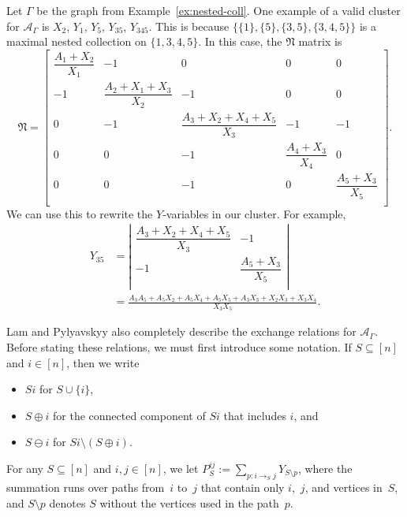 \documentclass[pdftex]{sigma}
\numberwithin{equation}{section}
\begin{document}
\begin{Example}\label{ex:graph-LP}
Let $\Gamma$ be the graph from Example~\ref{ex:nested-coll}. One example of a valid cluster for $\mathcal{A}_\Gamma$ is $X_2$, $Y_1$, $Y_5$, $Y_{35}$, $Y_{345}$. This is because $\{\{1\}, \{5\}, \{3,5\}, \{3,4,5\}\}$ is a maximal nested collection on $\{1,3,4,5\}$. In this case, the $\mathfrak{N}$ matrix is
\[
\mathfrak{N}=
\begin{bmatrix}
\dfrac{A_1+X_2}{X_1} & -1 & 0 & 0 & 0 \\
-1 & \dfrac{A_2+X_1+X_3}{X_2} & -1 & 0 & 0 \\
0 & -1 & \dfrac{A_3+X_2+X_4+X_5}{X_3} & -1 & -1 \\
0 & 0 & -1 & \dfrac{A_4+X_3}{X_4} & 0 \\
0 & 0 & -1 & 0 & \dfrac{A_5+X_3}{X_5} \\
\end{bmatrix}.
\]
We can use this to rewrite the $Y$-variables in our cluster. For example,
\begin{align*}
Y_{35}& =\left|
\begin{matrix}
\dfrac{A_3+X_2+X_4+X_5}{X_3} & -1 \\
-1 & \dfrac{A_5+X_3}{X_5} \\
\end{matrix}
\right|\\
& =\frac{A_3A_5+A_5X_2+A_5X_4+A_5X_5+A_3X_3+X_2X_3+X_3X_4}{X_3X_5}.
\end{align*}
\end{Example}
Lam and Pylyavskyy also completely describe the exchange relations for $\mathcal{A}_\Gamma$. Before stating these relations, we must first introduce some notation. If $S\subseteq[n]$ and $i\in[n]$, then we write
\begin{itemize}\itemsep=0pt
 \item $Si$ for $S\cup\{i\}$,
 \item $S\oplus i$ for the connected component of $Si$ that includes $i$, and
 \item $S\ominus i$ for $Si\setminus(S\oplus i)$.
\end{itemize}
For any $S\subseteq[n]$ and $i,j\in[n]$, we let $P_S^{ij} :=\sum_{p:i\to_S j}Y_{S\setminus p}$, where the summation runs over paths from~$i$ to~$j$ that contain only $i$,~$j$, and vertices in~$S$, and $S\setminus p$ denotes $S$ without the vertices used in the path~$p$.
\end{document}
